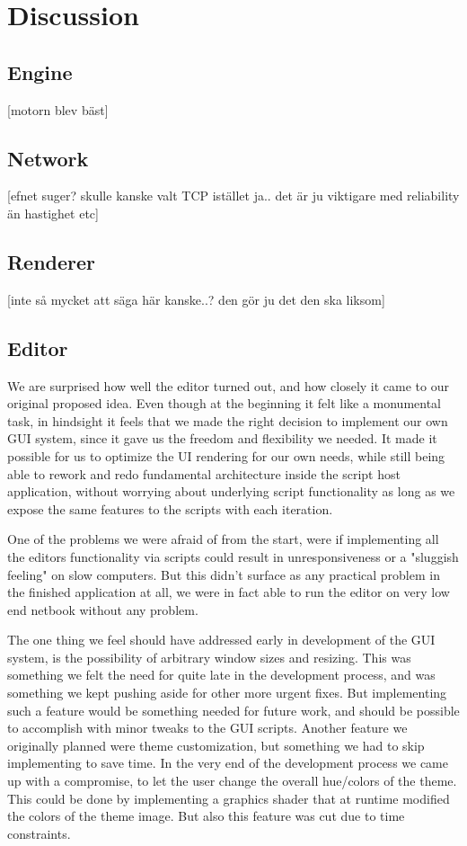 \chapter{Discussion}

\section{Engine}

[motorn blev bäst]

\section{Network}

[efnet suger? skulle kanske valt TCP istället ja.. det är ju viktigare med reliability än hastighet etc]

\section{Renderer}

[inte så mycket att säga här kanske..? den gör ju det den ska liksom]

\section{Editor}
We are surprised how well the editor turned out, and how closely it came to our original proposed idea. Even though at the beginning it felt like a monumental task, in hindsight it feels that we made the right decision to implement our own GUI system, since it gave us the freedom and flexibility we needed. It made it possible for us to optimize the UI rendering for our own needs, while still being able to rework and redo fundamental architecture inside the script host application, without worrying about underlying script functionality as long as we expose the same features to the scripts with each iteration.

One of the problems we were afraid of from the start, were if implementing all the editors functionality via scripts could result in unresponsiveness or a "sluggish feeling" on slow computers. But this didn't surface as any practical problem in the finished application at all, we were in fact able to run the editor on very low end netbook without any problem.

The one thing we feel should have addressed early in development of the GUI system, is the possibility of arbitrary window sizes and resizing. This was something we felt the need for quite late in the development process, and was something we kept pushing aside for other more urgent fixes. But implementing such a feature would be something needed for future work, and should be possible to accomplish with minor tweaks to the GUI scripts. Another feature we originally planned were theme customization, but something we had to skip implementing to save time. In the very end of the development process we came up with a compromise, to let the user change the overall hue/colors of the theme. This could be done by implementing a graphics shader that at runtime modified the colors of the theme image. But also this feature was cut due to time constraints. 

